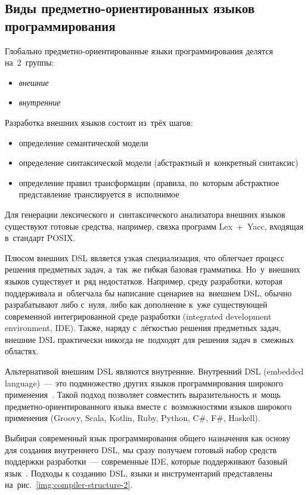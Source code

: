 \subsection{Виды предметно-ориентированных языков программирования} \label{sub122}
Глобально предметно-ориентированные языки программирования делятся на~2~группы: 
\begin{itemize} 
	\item{\textit{внешние}}
	\item{\textit{внутренние}}
\end{itemize}

Разработка внешних языков состоит из~трёх шагов:

\begin{itemize} 
	\item{определение семантической модели}
	\item{определение синтаксической модели (абстрактный и~конкретный синтаксис)}
	\item{определение правил трансформации (правила, по~которым абстрактное представление транслируется в~исполнимое}
\end{itemize}

Для генерации лексического и~синтаксического анализатора внешних языков существуют готовые средства, например, связка программ Lex~+~Yacc, входящая в~стандарт POSIX. 

Плюсом внешних DSL является узкая специализация, что облегчает процесс решения предметных задач, а~так~же гибкая базовая грамматика. Но~у~внешних языков существует и~ряд недостатков. Например, среду разработки, которая поддерживала и~облегчала бы написание сценариев на~внешнем
DSL, обычно разрабатывают либо с~нуля, либо как
дополнение к~уже существующей современной интегрированной среде разработки (integrated
development environment, IDE). Также, наряду с~лёгкостью решения предметных задач, внешние DSL практически никогда не~подходят для решения задач в~смежных областях.

Альтернативой внешним DSL являются внутренние. Внутренний DSL (embedded language)~--- это подмножество других языков программирования широкого применения~\cite{VanDeursen2000}. Такой подход позволяет совместить выразительность и~мощь предметно-ориентированного языка вместе с~возможностями языков широкого применения (Groovy, Scala, Kotlin, Ruby, Python, C\#, F\#, Haskell). 

Выбирая современный язык программирования общего назначения как основу для создания
внутреннего DSL, мы сразу получаем готовый
набор средств поддержки разработки~--- современные IDE, которые поддерживают базовый язык~\cite{Botov}. Подходы к созданию DSL, языки и инструментарий представлены на~рис.~\ref{img:compiler-structure-2}.

